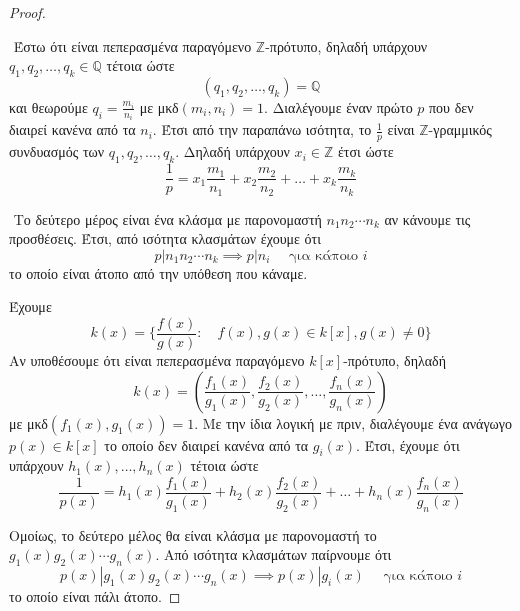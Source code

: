 \documentclass[oneside,a4paper]{article}
\newcommand{\Z}{\mathbb{Z}}
\newcommand{\Q}{\mathbb{Q}}
\begin{document}
\begin{proof} $ $
	
	$ $\newline
	Έστω ότι είναι πεπερασμένα παραγόμενο $\Z$-πρότυπο, δηλαδή υπάρχουν $q_1, q_2, \ldots ,q_k \in \Q$ τέτοια ώστε $$(q_1,q_2,\ldots ,q_k) = \Q$$ και θεωρούμε $q_i = \frac{m_i}{n_i}$ με μκδ$(m_i,n_i)=1$. Διαλέγουμε έναν πρώτο $p$ που δεν διαιρεί κανένα από τα $n_i$. Έτσι από την παραπάνω ισότητα, το $\frac 1p$ είναι $\Z$-γραμμικός συνδυασμός των $q_1,q_2,\ldots, q_k$. Δηλαδή υπάρχουν $x_i \in \Z$ έτσι ώστε $$\frac 1p = x_1 \frac{m_1}{n_1} + x_2 \frac{m_2}{n_2} + \ldots + x_k \frac{m_k}{n_k}$$

	$ $\newline
	Το δεύτερο μέρος είναι ένα κλάσμα με παρονομαστή $n_1 n_2 \cdots n_k$ αν κάνουμε τις προσθέσεις. Έτσι, από ισότητα κλασμάτων έχουμε ότι $$p | n_1 n_2 \cdots n_k \implies p|n_i \quad \text{ για κάποιο } i$$ το οποίο είναι άτοπο από την υπόθεση που κάναμε.

	$ $\newline Έχουμε $$k(x) = \big\{\frac{f(x)}{g(x)}: \quad f(x),g(x) \in k[x], g(x)\neq 0 \big\}$$ Αν υποθέσουμε ότι είναι πεπερασμένα παραγόμενο $k[x]$-πρότυπο, δηλαδή $$k(x) = \left(\frac{f_1 (x)}{g_1(x)}, \frac{f_2 (x)}{g_2(x)} , \ldots , \frac{f_n (x)}{g_n(x)}\right)$$ με μκδ$(f_1(x),g_1(x))=1$. Με την ίδια λογική με πριν, διαλέγουμε ένα ανάγωγο $p(x) \in k[x]$ το οποίο δεν διαιρεί κανένα από τα $g_i(x)$. Έτσι, έχουμε ότι υπάρχουν $h_1(x),\ldots, h_n(x)$ τέτοια ώστε $$\frac{1}{p(x)} = h_1(x)\frac{f_1 (x)}{g_1(x)} + h_2(x) \frac{f_2 (x)}{g_2(x)} + \ldots + h_n(x) \frac{f_n (x)}{g_n(x)}$$

	$ $\newline Ομοίως, το δεύτερο μέλος θα είναι κλάσμα με παρονομαστή το $g_1(x) g_2 (x) \cdots g_n(x)$. Από ισότητα κλασμάτων παίρνουμε ότι $$p(x) | g_1(x) g_2(x) \cdots g_n(x) \implies p(x) | g_i(x) \quad \text{ για κάποιο } i$$ το οποίο είναι πάλι άτοπο.
\end{proof}
\pagebreak
\end{document}
